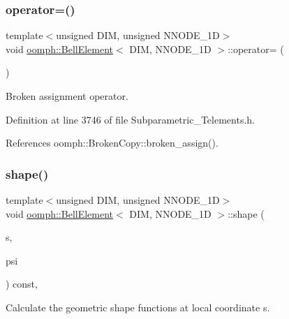 \subsubsection{\texorpdfstring{operator=()}{operator=()}}
{\footnotesize\ttfamily template$<$unsigned D\+IM, unsigned N\+N\+O\+D\+E\+\_\+1D$>$ \\
void \hyperlink{classoomph_1_1BellElement}{oomph\+::\+Bell\+Element}$<$ D\+IM, N\+N\+O\+D\+E\+\_\+1D $>$\+::operator= (\begin{DoxyParamCaption}\item[{const \hyperlink{classoomph_1_1BellElement}{Bell\+Element}$<$ D\+IM, N\+N\+O\+D\+E\+\_\+1D $>$ \&}]{ }\end{DoxyParamCaption})\hspace{0.3cm}{\ttfamily [inline]}}



Broken assignment operator. 



Definition at line 3746 of file Subparametric\+\_\+\+Telements.\+h.



References oomph\+::\+Broken\+Copy\+::broken\+\_\+assign().

\mbox{\label{classoomph_1_1BellElement_adcf9c26fca0f635473b1f0a0ff45e47d}} 
\subsubsection{\texorpdfstring{shape()}{shape()}}
{\footnotesize\ttfamily template$<$unsigned D\+IM, unsigned N\+N\+O\+D\+E\+\_\+1D$>$ \\
void \hyperlink{classoomph_1_1BellElement}{oomph\+::\+Bell\+Element}$<$ D\+IM, N\+N\+O\+D\+E\+\_\+1D $>$\+::shape (\begin{DoxyParamCaption}\item[{const \hyperlink{classoomph_1_1Vector}{Vector}$<$ double $>$ \&}]{s,  }\item[{\hyperlink{classoomph_1_1Shape}{Shape} \&}]{psi }\end{DoxyParamCaption}) const\hspace{0.3cm}{\ttfamily [inline]}, {\ttfamily [virtual]}}



Calculate the geometric shape functions at local coordinate s. 



